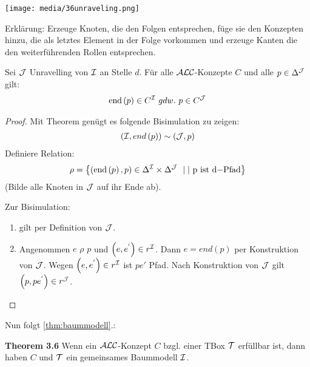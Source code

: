 \texttt{[image: media/36unraveling.png]}

Erklärung: Erzeuge Knoten, die den Folgen entsprechen, füge sie den
Konzepten hinzu, die als letztes Element in der Folge vorkommen und
erzeuge Kanten die den weiterführenden Rollen entsprechen.

\begin{lemma}[Unravelling]
    \label{lemma37}
    \label{lem:unravelling}
Sei $\mathcal{J}$ Unravelling von $\mathcal{I}$ an Stelle $d$. Für alle $\mathcal{A}\mathcal{L}\mathcal{C}$-Konzepte $C$ und alle $p \in \Delta^{\mathcal{J}}$ gilt:
\begin{align*}
\text{end}\left( p \right) \in C^{\mathcal{I}}\ gdw.\ p \in C^{\mathcal{J}}
\end{align*}
\end{lemma}

\begin{tafel}
\begin{proof}
Mit Theorem genügt es folgende Bisimulation zu zeigen:
\begin{align*}
\left( \mathcal{I},end\left( p \right) \right)\sim\left( \mathcal{J},p \right)\\
\end{align*}
Definiere Relation:
\begin{align*}
\rho = \left\{ \left( \text{end}\left( p \right),p \right) \in \Delta^{\MI}
        \times \Delta^{\MJ}\  \mid|\text{\ p\ }\mathrm{\text{ist}}\text{\ d}\mathrm{- Pfad}\right\}
\end{align*}
(Bilde alle Knoten in $\mathcal{J}$ auf ihr Ende ab). 

Zur Bisimulation:
\begin{enumerate}
\item gilt per Definition von $\mathcal{J}$.
\item
  Angenommen $e$ $\rho$ $p$ und
  $\left( e,e^{'} \right) \in r^{\mathcal{I}}$. Dann $e = end\left( p \right)$
  per Konstruktion von $\mathcal{J}$. Wegen $\left( e,e^{'} \right) \in r^{\mathcal{I}}$
  ist $pe'$ Pfad. Nach Konstruktion von $\mathcal{J}$ gilt
  $\left( p,pe^{'} \right) \in r^{\mathcal{J}}$.
\end{enumerate}
\end{proof}
\end{tafel}

Nun folgt \autoref{thm:baummodell}.:

\textbf{Theorem 3.6} Wenn ein $\mathcal{A}\mathcal{L}\mathcal{C}$-Konzept $C$ bzgl. einer TBox $\mathcal{T}$ erfüllbar ist, dann haben $C$ und $\mathcal{T}$ ein gemeinsames Baummodell $\mathcal{I}$.

